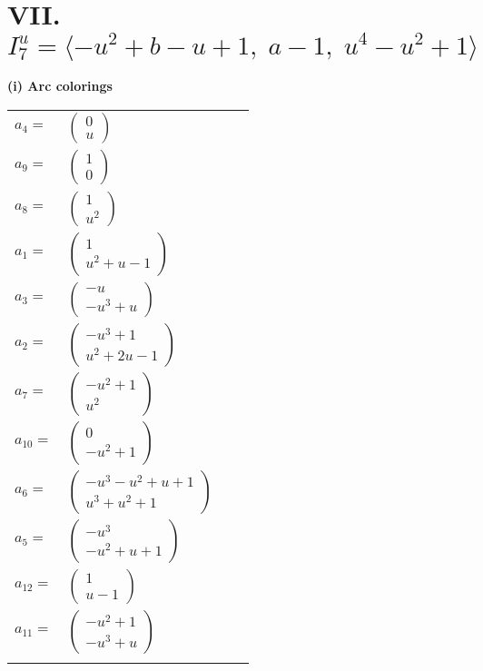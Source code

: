 \documentclass[1p]{elsarticle_modified}
\theoremstyle{definition}
\begin{document}
\centering \section*{VII. $I^u_{7}= \langle - u^2+b- u+1,\;a-1,\;u^4- u^2+1 \rangle$}
\flushleft \textbf{(i) Arc colorings}\\
\begin{tabular}{m{7pt} m{180pt} m{7pt} m{180pt} }
\flushright $a_{4}=$&$\begin{pmatrix}0\\u\end{pmatrix}$ \\
\flushright $a_{9}=$&$\begin{pmatrix}1\\0\end{pmatrix}$ \\
\flushright $a_{8}=$&$\begin{pmatrix}1\\u^2\end{pmatrix}$ \\
\flushright $a_{1}=$&$\begin{pmatrix}1\\u^2+u-1\end{pmatrix}$ \\
\flushright $a_{3}=$&$\begin{pmatrix}- u\\- u^3+u\end{pmatrix}$ \\
\flushright $a_{2}=$&$\begin{pmatrix}- u^3+1\\u^2+2 u-1\end{pmatrix}$ \\
\flushright $a_{7}=$&$\begin{pmatrix}- u^2+1\\u^2\end{pmatrix}$ \\
\flushright $a_{10}=$&$\begin{pmatrix}0\\- u^2+1\end{pmatrix}$ \\
\flushright $a_{6}=$&$\begin{pmatrix}- u^3- u^2+u+1\\u^3+u^2+1\end{pmatrix}$ \\
\flushright $a_{5}=$&$\begin{pmatrix}- u^3\\- u^2+u+1\end{pmatrix}$ \\
\flushright $a_{12}=$&$\begin{pmatrix}1\\u-1\end{pmatrix}$ \\
\flushright $a_{11}=$&$\begin{pmatrix}- u^2+1\\- u^3+u\end{pmatrix}$\\&\end{tabular}
\end{document}
